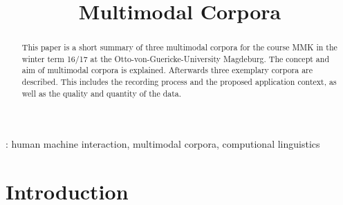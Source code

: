 \documentclass[a4paper]{article}
\title{Multimodal Corpora}
\begin{document}
  \maketitle
  \begin{abstract}
    This paper is a short summary of three multimodal corpora for the course MMK in the winter term
    16/17 at the Otto-von-Guericke-University Magdeburg. The concept and aim of multimodal corpora is 
    explained. Afterwards three exemplary corpora are described. This includes the recording process 
    and the proposed application context, as well as the quality and quantity of the data.
  \end{abstract}
  : human machine interaction, multimodal corpora, computional linguistics



  \section{Introduction}

    


  \newpage
  \eightpt
  

  
\end{document}
